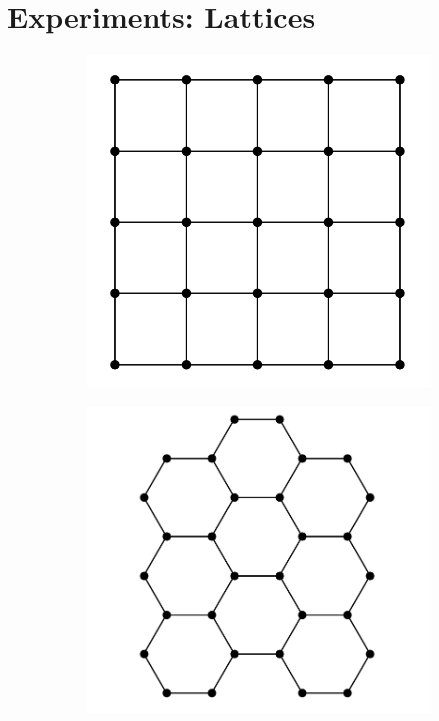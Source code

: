 \chapter{Experiments: Lattices}
\label{ch:regular-tilings}



\begin{figure}[t]
  \centering
  \begin{subfigure}{.32\textwidth}
    \centering
    \includegraphics[width=1.0\linewidth]{figures/square.png}
    \label{fig:rt-square}
  \end{subfigure}
  \begin{subfigure}{.32\textwidth}
    \centering
    \includegraphics[width=1.0\linewidth]{figures/hex.png}

\end{subfigure}
\end{figure}
